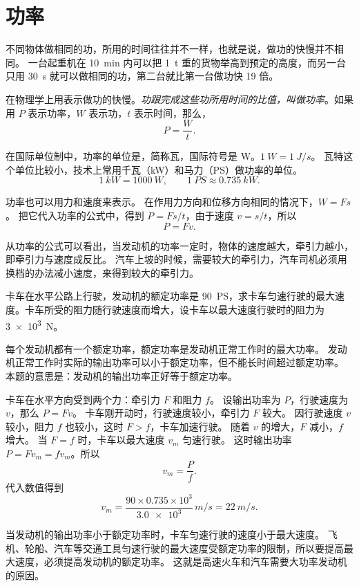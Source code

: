 \section{功率}
不同物体做相同的功，所用的时间往往并不一样，也就是说，做功的快慢并不相同。
一台起重机在 \qty{10}{min} 内可以把 \qty{1}{t} 重的货物举高到预定的高度，而另一台只用 \qty{30}{s} 就可以做相同的功，第二台就比第一台做功快 19 倍。

在物理学上用表示做功的快慢。\emph{功跟完成这些功所用时间的比值，叫做功率}。如果用 $P$ 表示功率，$W$ 表示功，$t$ 表示时间，那么，
\[P=\frac{W}{t}.\]

在国际单位制中，功率的单位是，简称瓦，国际符号是 \unit{W}。$\qty{1}{W}=\qty{1}{J/s}$。
瓦特这个单位比较小，技术上常用千瓦（\unit{kW}）和马力（\unit{PS}）做功率的单位。
\[ \qty{1}{kW}= \qty{1000}{W},\qquad \qty{1}{PS}\approx \qty{0.735}{kW}.\]

功率也可以用力和速度来表示。
在作用力方向和位移方向相同的情况下，$W=Fs$。
把它代入功率的公式中，得到 $P=Fs/t$，由于速度 $v=s/t$，所以
\[P=Fv.\]

从功率的公式可以看出，当发动机的功率一定时，物体的速度越大，牵引力越小，即牵引力与速度成反比。
汽车上坡的时候，需要较大的牵引力，汽车司机必须用换档的办法减小速度，来得到较大的牵引力。

\begin{example}
卡车在水平公路上行驶，发动机的额定功率是 \qty{90}{PS}，求卡车匀速行驶的最大速度。卡车所受的阻力随行驶速度而增大，设卡车以最大速度行驶时的阻力为 \qty{3e3}{N}。
\end{example}

\begin{solution}
每个发动机都有一个额定功率，额定功率是发动机正常工作时的最大功率。
发动机正常工作时实际的输出功率可以小于额定功率，但不能长时间超过额定功率。
本题的意思是：发动机的输出功率正好等于额定功率。

卡车在水平方向受到两个力：牵引力 $F$ 和阻力 $f$。
设输出功率为 $P$，行驶速度为 $v$，那么 $P=Fv$。
卡车刚开动时，行驶速度较小，牵引力 $F$ 较大。
因行驶速度 $v$ 较小，阻力 $f$ 也较小，这时 $F>f$，卡车加速行驶。
随着 $v$ 的增大，$F$ 减小，$f$ 增大。
当 $F=f$ 时，卡车以最大速度 $v_m$ 匀速行驶。
这时输出功率 $P=Fv_m=fv_m$。所以
\[v_m=\frac{P}{f}.\]
代入数值得到
\[v_m=\frac{90\times 0.735\times 10^3}{\num{3.0e3}}\,\unit{m/s}=\qty{22}{m/s}.\]

当发动机的输出功率小于额定功率时，卡车匀速行驶的速度小于最大速度。
飞机、轮船、汽车等交通工具匀速行驶的最大速度受额定功率的限制，所以要提高最大速度，必须提高发动机的额定功率。
这就是高速火车和汽车需要大功率发动机的原因。
\end{solution}
	
